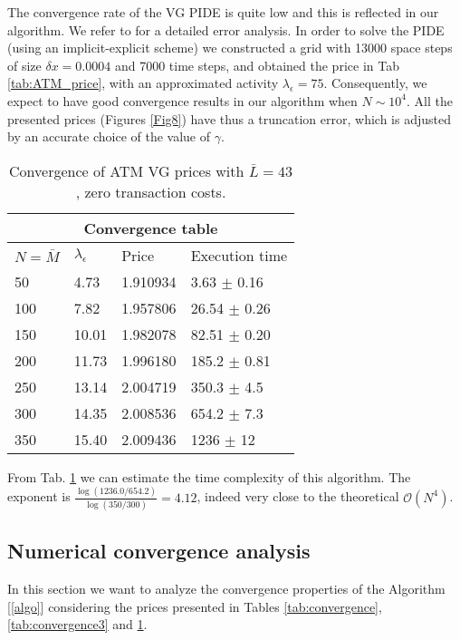 The convergence rate of the VG PIDE is quite low and this is reflected in our algorithm. We refer to \cite{CoVo05b} for a detailed error analysis.
In order to solve the PIDE (using an implicit-explicit scheme) we constructed
a grid with 13000 space steps of size $\delta x = 0.0004$ and 7000 time steps, and obtained the price in Tab \ref{tab:ATM_price}, 
with an approximated activity $\lambda_{\epsilon} = 75$.
Consequently, we expect to have good convergence results in our algorithm when $N\sim 10^4$.
All the presented prices (Figures \ref{Fig8}) have thus a truncation error, which is adjusted by an accurate choice of the value of $\gamma$. 
\begin{table}[ht]
\centering
 \begin{tabular}{llll}
 \toprule
  \multicolumn{4}{c}{\textbf{Convergence table}} \\
  \midrule
  $N = \bar M$ & $\lambda_{\epsilon}$ & Price & Execution time \\
  \midrule
    50  & 4.73  & 1.910934 & 3.63 $\pm$ 0.16 \\
    100 & 7.82  & 1.957806 & 26.54 $\pm$ 0.26 \\
    150 & 10.01 & 1.982078 & 82.51 $\pm$ 0.20 \\
    200 & 11.73 & 1.996180 & 185.2 $\pm$ 0.81 \\
    250 & 13.14 & 2.004719 & 350.3 $\pm$ 4.5 \\
    300 & 14.35 & 2.008536 & 654.2 $\pm$ 7.3\\ 
    350 & 15.40 & 2.009436 & 1236 $\pm$ 12 \\
  \bottomrule
  \end{tabular}
  \caption{Convergence of ATM VG prices with $\bar L =43$, zero transaction costs.}
  \label{tab:convergence4}
\end{table}

From Tab. \ref{tab:convergence4} we can estimate the time complexity of this algorithm. The exponent is $\frac{\log(1236.0/654.2)}{\log(350/300)} = 4.12$, 
indeed very close to the theoretical $\mathcal{O}(N^4)$. 


\subsection{Numerical convergence analysis}\label{num_conv_analysis}

In this section we want to analyze the convergence properties of the Algorithm [\ref{algo}] considering the prices presented in 
Tables \ref{tab:convergence}, \ref{tab:convergence3} and \ref{tab:convergence4}. 

